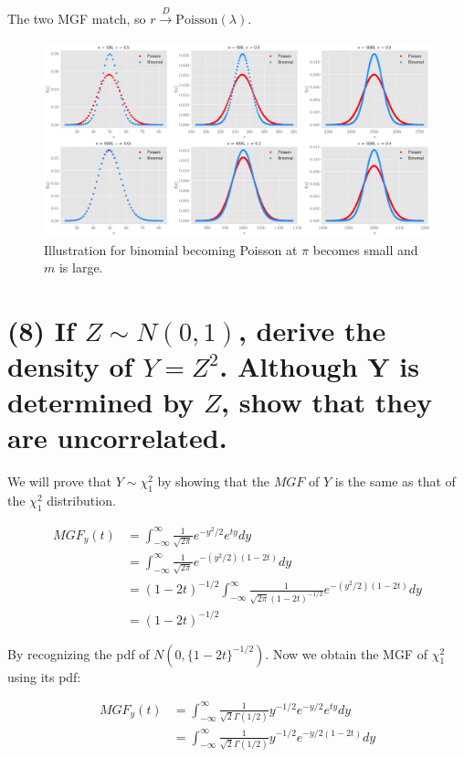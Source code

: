 \documentclass[11pt]{article}
\begin{document}
The two MGF match, so $r \xrightarrow[]{D}
\text{Poisson}(\lambda)$.


\begin{figure}[!h]
    \centering
    \includegraphics[scale=.35]{homework_1/third_hist.png}
    \caption{Illustration for binomial becoming Poisson at $\pi$ becomes small and $m$ is large.}
    \label{fig:my_label}
\end{figure}

\newpage
\section*{(8) If $Z \sim N(0, 1)$, derive the density of $Y=Z^2$. Although Y is
determined by $Z$, show that they are uncorrelated.}
We will prove that $Y \sim \chi^2_1$ by showing that the $MGF$ of $Y$ is the same as that of the $\chi^2_1$ distribution.




 \begin{align*}
     MGF_y(t) &= \int_{-\infty}^{\infty} \frac{1}{\sqrt{2\pi}}e^{-y^2/2}e^{ty}dy\\
     &= \int_{-\infty}^{\infty} \frac{1}{\sqrt{2\pi}}e^{-(y^2/2)(1-2t)}dy\\
     &= (1-2t)^{-1/2}\int_{-\infty}^{\infty} \frac{1}{\sqrt{2\pi}(1-2t)^{-1/2}}e^{-(y^2/2)(1-2t)}dy\\
     &= (1-2t)^{-1/2}
 \end{align*}
 
 By recognizing the pdf of $N(0, \{1-2t\}^{-1/2})$. Now we obtain the MGF of $\chi^2_1$ using its pdf:
 
  \begin{align*}
     MGF_y(t) &=   \int_{-\infty}^{\infty} \frac{1}{\sqrt{2}\Gamma(1/2)} y^{-1/2}e^{-y/2}e^{ty}dy\\
     &=  \int_{-\infty}^{\infty} \frac{1}{\sqrt{2}\Gamma(1/2)} y^{-1/2}e^{-y/2(1-2t)}dy
 \end{align*}
 
\end{document}
